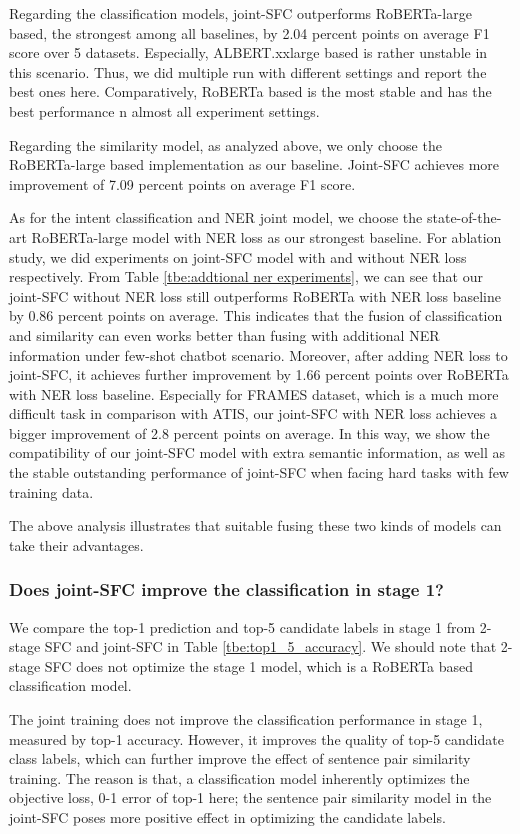 Regarding the  classification  models,  joint-SFC
outperforms RoBERTa-large based, the strongest among all baselines, 
by 2.04 percent points on average F1 score over 5 datasets.  
Especially, ALBERT.xxlarge based is rather unstable  in this scenario. Thus, 
we did multiple run with different settings and  report the  best  ones here. 
Comparatively,  RoBERTa  based is  the  most stable and has the best performance 
n almost all experiment settings.

Regarding  the  similarity  model,  as  analyzed  above,  we  only  choose the
RoBERTa-large based implementation as our baseline. Joint-SFC achieves more improvement of
7.09  percent points  on average F1 score. 

As for the intent classification and NER joint model, we choose the state-of-the-art RoBERTa-large model with NER loss as our strongest baseline. For ablation study, we did experiments on joint-SFC model with and without NER loss respectively. From Table \ref{tbe:addtional ner experiments}, we can see that our joint-SFC without NER loss still outperforms RoBERTa with NER loss baseline by 0.86 percent points on average. This indicates that the fusion of classification and similarity can even works better than fusing with additional NER information under few-shot chatbot scenario. Moreover, after adding NER loss to joint-SFC, it achieves further improvement by 1.66 percent points over RoBERTa with NER loss baseline. Especially for FRAMES dataset, which is a much more difficult task in comparison with ATIS, our joint-SFC with NER loss achieves a bigger improvement of 2.8 percent points on average. In this way, we show the compatibility of our joint-SFC model with extra semantic information, as well as the stable outstanding performance of joint-SFC when facing hard tasks with few training data.

The above analysis illustrates that suitable fusing these two kinds of models
can take their advantages.

\subsubsection*{Does joint-SFC improve the classification in stage 1?}
We  compare  the  top-1  prediction and top-5 candidate labels in stage 1 from
2-stage SFC and joint-SFC in Table \ref{tbe:top1_5_accuracy}. We should note
that  2-stage  SFC  does not optimize the stage 1 model, which is a RoBERTa
based classification model.

The joint training does not improve the classification performance in stage 1,
measured  by  top-1  accuracy.  However,  it  improves  the  quality of top-5
candidate  class  labels, which can further improve the effect of sentence pair
similarity training. The reason is that, a classification model
inherently optimizes the objective loss, 0-1 error of top-1 here; the sentence
pair similarity model in the joint-SFC poses more positive effect in optimizing the 
candidate labels.


